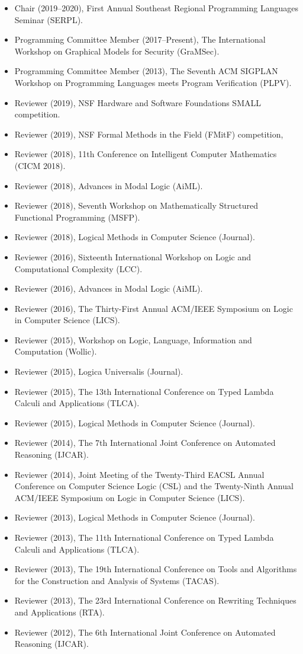 \documentclass[11pt]{article}
\begin{document}
\begin{itemize}\itemsep-2px
  \item Chair (2019--2020), First Annual Southeast Regional Programming Languages Seminar (SERPL).
  \item Programming Committee Member (2017--Present), The International Workshop on Graphical Models for Security (GraMSec). 
  \item Programming Committee Member (2013), The Seventh ACM SIGPLAN Workshop on Programming Languages meets Program Verification (PLPV).
  \item Reviewer (2019), NSF Hardware and Software Foundations SMALL competition.
  \item Reviewer (2019), NSF Formal Methods in the Field (FMitF) competition,
  \item Reviewer (2018), 11th Conference on Intelligent Computer Mathematics (CICM 2018).
  \item Reviewer (2018), Advances in Modal Logic (AiML).
  \item Reviewer (2018), Seventh Workshop on Mathematically Structured Functional Programming (MSFP).
  \item Reviewer (2018), Logical Methods in Computer Science (Journal).
  \item Reviewer (2016), Sixteenth International Workshop on Logic and Computational Complexity (LCC).
  \item Reviewer (2016), Advances in Modal Logic (AiML).
  \item Reviewer (2016), The Thirty-First Annual ACM/IEEE Symposium on Logic in Computer Science (LICS).
  \item Reviewer (2015), Workshop on Logic, Language, Information and Computation (Wollic).          
  \item Reviewer (2015), Logica Universalis (Journal).    
  \item Reviewer (2015), The 13th International Conference on Typed Lambda Calculi and Applications (TLCA).    
  \item Reviewer (2015), Logical Methods in Computer Science (Journal).    
  \item Reviewer (2014), The 7th International Joint Conference on Automated Reasoning (IJCAR).
  \item Reviewer (2014), Joint Meeting of the Twenty-Third EACSL Annual Conference on Computer Science Logic (CSL) and the Twenty-Ninth Annual ACM/IEEE Symposium on Logic in Computer Science (LICS).
  \item Reviewer (2013), Logical Methods in Computer Science (Journal).    
  \item Reviewer (2013), The 11th International Conference on Typed Lambda Calculi and Applications (TLCA).
  \item Reviewer (2013), The 19th International Conference on Tools and Algorithms for the Construction and Analysis of Systems (TACAS).  
  \item Reviewer (2013), The 23rd International Conference on Rewriting Techniques and Applications (RTA).
  \item Reviewer (2012), The 6th International Joint Conference on Automated Reasoning (IJCAR).
  \end{itemize}
\end{document}
